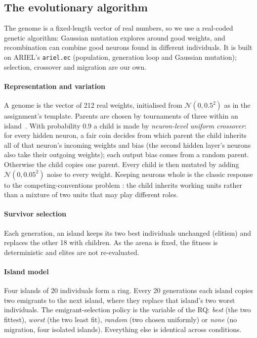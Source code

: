 \documentclass[sigconf]{acmart}
\begin{document}
\subsection{The evolutionary algorithm}

The genome is a fixed-length vector of real numbers, so we use a real-coded
genetic algorithm: Gaussian mutation explores around good weights, and
recombination can combine good neurons found in different individuals. It is
built on ARIEL's \texttt{ariel.ec} (population, generation loop and Gaussian
mutation); selection, crossover and migration are our own.

\paragraph{Representation and variation} A genome is the vector of 212 real
weights, initialised from $\mathcal{N}(0, 0.5^2)$ as in the assignment's
template. Parents are chosen by
tournaments of three within an island~\cite{eiben2015introduction}. With probability 0.9 a child is made by
\emph{neuron-level uniform crossover}: for every hidden neuron, a fair coin
decides from which parent the child inherits all of that neuron's incoming weights and
bias (the second hidden layer's neurons also take their outgoing weights);
each output bias comes from a random parent. Otherwise the child copies one
parent. Every child is then mutated by adding $\mathcal{N}(0, 0.05^2)$ noise to
every weight. Keeping neurons whole is the
classic response to the competing-conventions problem
\cite{montana1989training,moriarty1996efficient}: the child inherits working
units rather than a mixture of two units that may play different roles.

\paragraph{Survivor selection} Each generation, an island keeps its two
best individuals unchanged (elitism) and replaces the other 18 with children. As
the arena is fixed, the fitness is deterministic and elites are not
re-evaluated.

\paragraph{Island model} Four islands of 20 individuals form a ring. Every 20
generations each island copies two emigrants to the next island, where they
replace that island's two worst individuals. The emigrant-selection policy is
the variable of the RQ: \emph{best} (the two fittest), \emph{worst} (the two
least fit), \emph{random} (two chosen uniformly) or \emph{none} (no migration,
four isolated islands). Everything else is identical across conditions.
\end{document}
